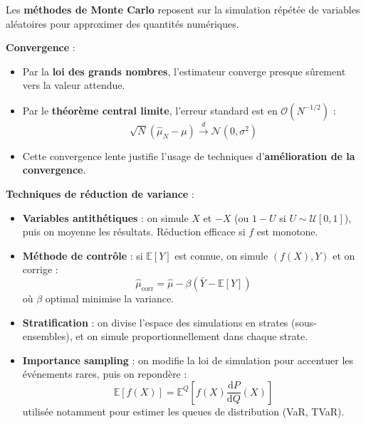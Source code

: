 \begin{f}

Les \textbf{méthodes de Monte Carlo} reposent sur la simulation répétée de variables aléatoires pour approximer des quantités numériques.

\textbf{Convergence} :
\begin{itemize}[nosep]
	\item Par la \textbf{loi des grands nombres}, l’estimateur converge presque sûrement vers la valeur attendue.
	\item Par le \textbf{théorème central limite}, l’erreur standard est en \(\mathcal{O}(N^{-1/2})\) :
	\[
	\sqrt{N}(\hat{\mu}_N - \mu) \xrightarrow{d} \mathcal{N}(0, \sigma^2)
	\]
	\item Cette convergence lente justifie l’usage de techniques d’\textbf{amélioration de la convergence}.
\end{itemize}

\textbf{Techniques de réduction de variance} :
\begin{itemize}
	\item \textbf{Variables antithétiques} : on simule \(X\) et \(-X\) (ou \(1-U\) si \(U \sim \mathcal{U}[0,1]\)), puis on moyenne les résultats. Réduction efficace si \(f\) est monotone.
	\item \textbf{Méthode de contrôle} : si \(\mathbb{E}[Y]\) est connue, on simule \((f(X), Y)\) et on corrige :
	\[
	\hat{\mu}_\text{corr} = \hat{\mu} - \beta(\bar{Y} - \mathbb{E}[Y])
	\]
	où \(\beta\) optimal minimise la variance.
	\item \textbf{Stratification} : on divise l’espace des simulations en strates (sous-ensembles), et on simule proportionnellement dans chaque strate.
	\item \textbf{Importance sampling} : on modifie la loi de simulation pour accentuer les événements rares, puis on repondère :
	\[
	\mathbb{E}[f(X)] = \mathbb{E}^{Q}\left[f(X) \frac{\mathrm{d}P}{\mathrm{d}Q}(X)\right]
	\]
	utilisée notamment pour estimer les queues de distribution (VaR, TVaR).
\end{itemize}

\end{f}
